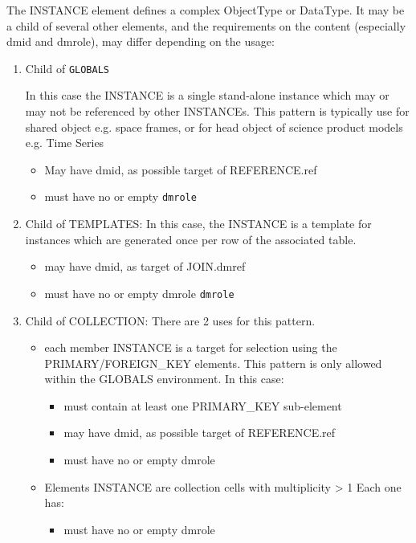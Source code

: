 The INSTANCE element defines a complex ObjectType or DataType.
It may be a child of several other elements, and the requirements on
the content (especially dmid and dmrole), may differ depending on
the usage:


\begin{enumerate}
\item Child of \texttt{GLOBALS}

   In this case the INSTANCE is a single stand-alone instance which
   may or may not be referenced by other INSTANCEs. This pattern is typically use for 
   shared object e.g. space frames, or for head object of science product models e.g. Time Series
  \begin{itemize}
     \item May have dmid, as possible target of REFERENCE.ref
     \item must have no or empty \texttt{dmrole}
  \end{itemize}  
     
\item Child of TEMPLATES:
  In this case, the INSTANCE is a template for instances which
  are generated once per row of the associated table.  
  \begin{itemize}
     \item may have dmid, as target of JOIN.dmref
     \item must have no or empty dmrole \texttt{dmrole}
  \end{itemize}  

\item Child of COLLECTION:
  There are 2 uses for this pattern.  
  \begin{itemize}
     \item each member INSTANCE is a target for selection using
           the PRIMARY/FOREIGN\_KEY elements. This pattern is only 
           allowed within the GLOBALS environment. In this case:             
           \begin{itemize}
             \item must contain at least one PRIMARY\_KEY sub-element
             \item may have dmid, as possible target of REFERENCE.ref
             \item must have no or empty dmrole
           \end{itemize}

     \item Elements INSTANCE are collection cells with multiplicity > 1
          Each one has:             
           \begin{itemize}
             \item must have no or empty dmrole
           \end{itemize}
  \end{itemize}  
    

\end{enumerate}
